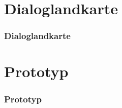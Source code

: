 \documentclass{beamer}
\begin{document}
\section{Dialoglandkarte}
\begin{frame}
\frametitle{Dialoglandkarte}
\end{frame}

\section{Prototyp}
\begin{frame}
\frametitle{Prototyp}
\end{frame}
\end{document}
